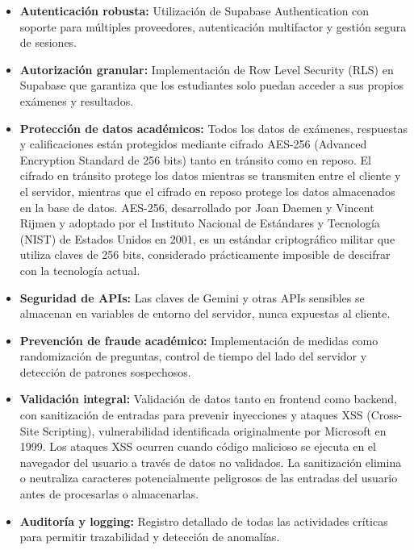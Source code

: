 \documentclass[12pt,a4paper]{report}
\begin{document}
\begin{itemize}
\item \textbf{Autenticación robusta:} Utilización de Supabase Authentication con soporte para múltiples proveedores, autenticación multifactor y gestión segura de sesiones.

\item \textbf{Autorización granular:} Implementación de Row Level Security (RLS) en Supabase que garantiza que los estudiantes solo puedan acceder a sus propios exámenes y resultados.

\item \textbf{Protección de datos académicos:} Todos los datos de exámenes, respuestas y calificaciones están protegidos mediante cifrado AES-256 (Advanced Encryption Standard de 256 bits) tanto en tránsito como en reposo. El cifrado en tránsito protege los datos mientras se transmiten entre el cliente y el servidor, mientras que el cifrado en reposo protege los datos almacenados en la base de datos. AES-256, desarrollado por Joan Daemen y Vincent Rijmen y adoptado por el Instituto Nacional de Estándares y Tecnología (NIST) de Estados Unidos en 2001, es un estándar criptográfico militar que utiliza claves de 256 bits, considerado prácticamente imposible de descifrar con la tecnología actual.

\item \textbf{Seguridad de APIs:} Las claves de Gemini y otras APIs sensibles se almacenan en variables de entorno del servidor, nunca expuestas al cliente.

\item \textbf{Prevención de fraude académico:} Implementación de medidas como randomización de preguntas, control de tiempo del lado del servidor y detección de patrones sospechosos.

\item \textbf{Validación integral:} Validación de datos tanto en frontend como backend, con sanitización de entradas para prevenir inyecciones y ataques XSS (Cross-Site Scripting), vulnerabilidad identificada originalmente por Microsoft en 1999. Los ataques XSS ocurren cuando código malicioso se ejecuta en el navegador del usuario a través de datos no validados. La sanitización elimina o neutraliza caracteres potencialmente peligrosos de las entradas del usuario antes de procesarlas o almacenarlas.

\item \textbf{Auditoría y logging:} Registro detallado de todas las actividades críticas para permitir trazabilidad y detección de anomalías.


\end{itemize}
\end{document}

